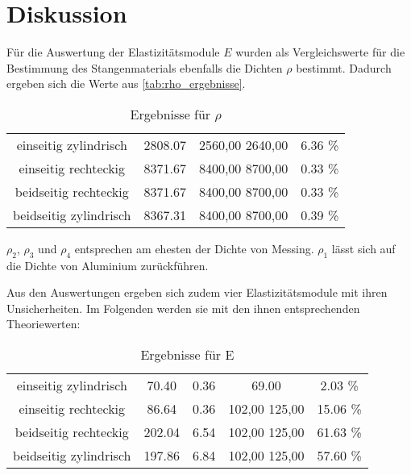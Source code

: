\section{Diskussion}
\label{sec:Diskussion}


Für die Auswertung der Elastizitätsmodule $E$ wurden als Vergleichswerte für die Bestimmung des Stangenmaterials ebenfalls die Dichten $\rho$ bestimmt. Dadurch ergeben sich die Werte aus \autoref{tab:rho_ergebnisse}.

\begin{table}
  \centering
  \caption{Ergebnisse für $\rho$}
  \label{tab:rho_ergebnisse}
  \begin{tabular}{c S S S}
    \toprule 
    &  &  &  \\ 
    \midrule 
    einseitig zylindrisch & 2808.07 & {2560,00  2640,00} & 6.36 \% \\
    einseitig rechteckig & 8371.67 & {8400,00  8700,00} & 0.33 \% \\
    beidseitig rechteckig & 8371.67 & {8400,00  8700,00} & 0.33 \% \\
    beidseitig zylindrisch & 8367.31 & {8400,00  8700,00} & 0.39 \% \\
    \bottomrule
  \end{tabular}
\end{table}

$\rho _2$, $\rho _3$ und $\rho _4$ entsprechen am ehesten der Dichte von Messing. $\rho _1$ lässt sich auf die Dichte von Aluminium zurückführen.\cite{dichten_metalle}

Aus den Auswertungen ergeben sich zudem vier Elastizitätsmodule mit ihren Unsicherheiten. Im Folgenden werden sie mit den ihnen entsprechenden Theoriewerten:

\begin{table}
  \centering
  \caption{Ergebnisse für E}
  \label{tab:e_ergebnisse}
  \begin{tabular}{c S S S S}
    \toprule 
    &  &  &  & \\ 
    \midrule 
    einseitig zylindrisch & 70.40 & 0.36 & 69.00 & 2.03  \% \\
    einseitig rechteckig & 86.64 & 0.36 & {102,00  125,00} & 15.06  \% \\
    beidseitig rechteckig & 202.04 & 6.54 & {102,00  125,00} & 61.63  \% \\
    beidseitig zylindrisch & 197.86 & 6.84 & {102,00  125,00} & 57.60  \% \\
    \bottomrule
  \end{tabular}
\end{table}